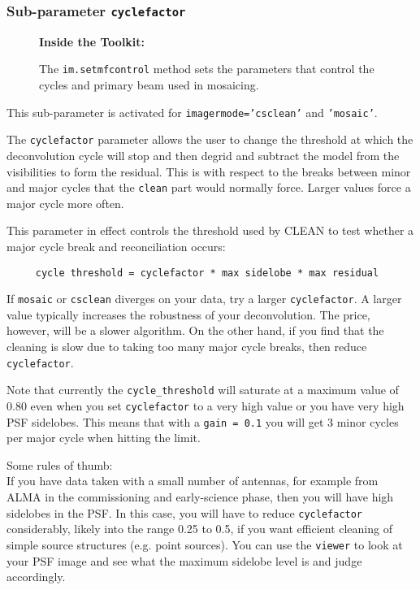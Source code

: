 \subsubsection{Sub-parameter {\tt cyclefactor} }
\label{section:im.clean.imagermode.cyclefactor}

\begin{wrapfigure}{r}{2.5in}
  \begin{boxedminipage}{2.5in}
     \centerline{\bf Inside the Toolkit:}
     The {\tt im.setmfcontrol} method sets the parameters that control
     the cycles and primary beam used in mosaicing.
  \end{boxedminipage}
\end{wrapfigure}

This sub-parameter is activated for {\tt imagermode='csclean'} and
{\tt 'mosaic'}.

The {\tt cyclefactor} parameter allows the user to change the
threshold at which the deconvolution cycle will stop and then degrid and
subtract the model from the visibilities to form the residual. This is
with respect to the breaks between minor and major cycles that the
{\tt clean} part would normally force.  Larger values force a major
cycle more often.  

This parameter in effect controls the threshold used by CLEAN to test whether
a major cycle break and reconciliation occurs:
\small
\begin{verbatim}
     cycle threshold = cyclefactor * max sidelobe * max residual
\end{verbatim}
\normalsize


If {\tt mosaic} or {\tt csclean} diverges on your data, try a larger
{\tt cyclefactor}. A larger value typically increases the
robustness of your deconvolution. The price, however, will be a slower
algorithm.  On the other hand, if you find that the cleaning is slow
due to taking too many major cycle breaks, then reduce
{\tt cyclefactor}.

Note that currently the {\tt cycle\_threshold} will saturate at a
maximum value of 0.80 even when you set {\tt cyclefactor} to a very
high value or you have very high PSF sidelobes.  This means that with
a {\tt gain = 0.1} you will get 3 minor cycles per major cycle when
hitting the limit.

\noindent Some rules of thumb:\\

If you have data taken with a small number of antennas, for example
from ALMA in the commissioning and early-science phase, then you will
have high sidelobes in the PSF.  In this case, you will have to reduce
{\tt cyclefactor} considerably, likely into the range 0.25 to 0.5,
if you want efficient cleaning of simple source structures (e.g. point
sources).  You can use the {\tt viewer} to look at your PSF image
and see what the maximum sidelobe level is and judge accordingly.

